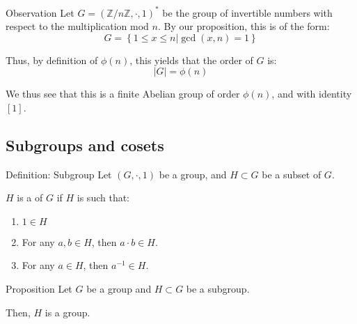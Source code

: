 \documentclass[a4paper]{article}
\begin{document}
\begin{parag}{Observation}
    Let $G = \left(\mathbb{Z}/{n}\mathbb{Z}, \cdot, 1\right)^*$ be the group of invertible numbers with respect to the multiplication mod $n$. By our proposition, this is of the form:
    \[G = \left\{1 \leq x \leq n | \gcd\left(x, n\right) = 1\right\}\]

    Thus, by definition of $\phi\left(n\right)$, this yields that the order of $G$ is: 
    \[\left|G\right| = \phi\left(n\right)\]
    
    We thus see that this is a finite Abelian group of order $\phi\left(n\right)$, and with identity $\left[1\right]$.
\end{parag}

\subsection{Subgroups and cosets}

\begin{parag}{Definition: Subgroup}
    Let $\left(G, \cdot, 1 \right)$ be a group, and $H \subset G$ be a subset of $G$.

    $H$ is a  of $G$ if $H$ is such that:
    \begin{enumerate}
        \item $1 \in H$
        \item For any $a, b \in H$, then $a\cdot b \in H$.
        \item For any $a \in H$, then $a^{-1} \in H$.
    \end{enumerate}
\end{parag}

\begin{parag}{Proposition}
    Let $G$ be a group and $H \subset G$ be a subgroup. 

    Then, $H$ is a group.
\end{parag}
\end{document}
